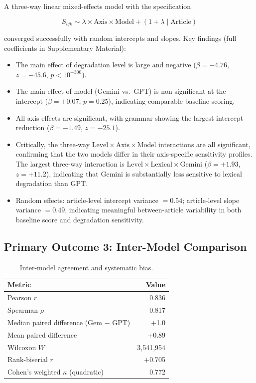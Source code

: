 \documentclass[11pt]{article}
\begin{document}
A three-way linear mixed-effects model with the specification

\begin{equation}
    S_{ijk} \sim \lambda \times \mathrm{Axis} \times \mathrm{Model} + (1 + \lambda \mid \text{Article})
\end{equation}

\noindent converged successfully with random intercepts and slopes. Key findings (full coefficients in Supplementary Material):

\begin{itemize}[nosep]
    \item The main effect of degradation level is large and negative ($\beta = -4.76$, $z = -45.6$, $p < 10^{-300}$).
    \item The main effect of model (Gemini vs.\ GPT) is non-significant at the intercept ($\beta = +0.07$, $p = 0.25$), indicating comparable baseline scoring.
    \item All axis effects are significant, with grammar showing the largest intercept reduction ($\beta = -1.49$, $z = -25.1$).
    \item Critically, the three-way $\mathrm{Level} \times \mathrm{Axis} \times \mathrm{Model}$ interactions are all significant, confirming that the two models differ in their axis-specific sensitivity profiles. The largest three-way interaction is $\mathrm{Level} \times \mathrm{Lexical} \times \mathrm{Gemini}$ ($\beta = +1.93$, $z = +11.2$), indicating that Gemini is substantially less sensitive to lexical degradation than GPT.
    \item Random effects: article-level intercept variance $= 0.54$; article-level slope variance $= 0.49$, indicating meaningful between-article variability in both baseline score and degradation sensitivity.
\end{itemize}

\FloatBarrier
\subsection{Primary Outcome 3: Inter-Model Comparison}

\begin{table}[t]
\centering
\caption{Inter-model agreement and systematic bias.}
\label{tab:intermodel}
\begin{tabular}{@{}lr@{}}
\toprule
\textbf{Metric} & \textbf{Value} \\
\midrule
Pearson $r$ & 0.836 \\
Spearman $\rho$ & 0.817 \\
Median paired difference (Gem $-$ GPT) & +1.0 \\
Mean paired difference & +0.89 \\
Wilcoxon $W$ & 3{,}541{,}954 \\
Rank-biserial $r$ & +0.705 \\
Cohen's weighted $\kappa$ (quadratic) & 0.772 \\
\bottomrule
\end{tabular}
\end{table}
\end{document}
